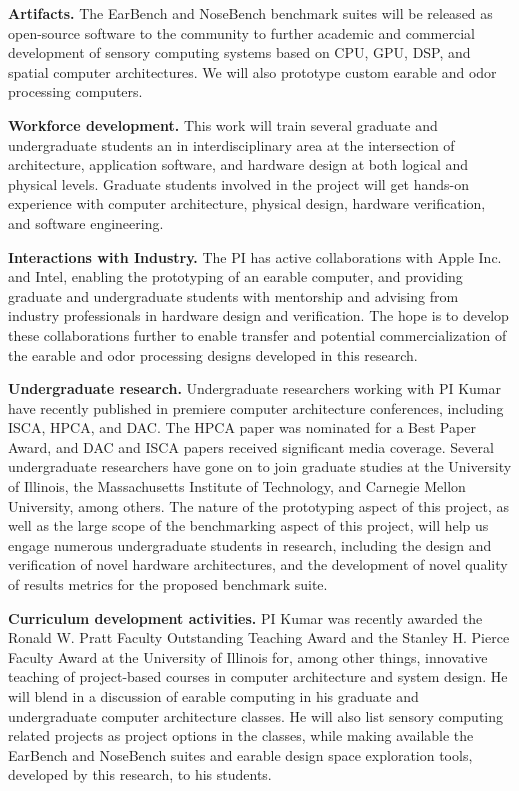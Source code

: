 \textbf{Artifacts.} The EarBench and NoseBench benchmark suites will be
released as open-source software to the community to further academic and
commercial development of sensory computing systems based on CPU, GPU, DSP, and
spatial computer architectures. We will also prototype custom earable
and odor processing computers.

\textbf{Workforce development.}  This work will train several graduate and
undergraduate students an in interdisciplinary area at the intersection of
architecture, application software, and hardware design at both logical and
physical levels.  Graduate students involved in the project will get hands-on
experience with computer architecture, physical design, hardware verification,
and software engineering.

\textbf{Interactions with Industry.}  The PI has active collaborations with
Apple Inc. and Intel, enabling the prototyping of an earable computer, and
providing graduate and undergraduate students with mentorship and advising from
industry professionals in hardware design and verification.  The hope is to
develop these collaborations further to enable transfer and potential
commercialization of the earable and odor processing designs developed in this
research.

\textbf{Undergraduate research.}  Undergraduate researchers working with PI
Kumar have recently published in premiere computer architecture conferences,
including ISCA, HPCA, and DAC.  The HPCA paper was nominated for a Best Paper
Award, and DAC and ISCA papers received significant media coverage.  Several
undergraduate researchers have gone on to join graduate studies at the
University of Illinois, the Massachusetts Institute of Technology, and Carnegie
Mellon University, among others.  The nature of the prototyping aspect of this
project, as well as the large scope of the benchmarking aspect of this project,
will help us engage numerous undergraduate students in research, including the
design and verification of novel hardware architectures, and the development of
novel quality of results metrics for the proposed benchmark suite.

\textbf{Curriculum development activities.}  PI Kumar was recently awarded the
Ronald W. Pratt Faculty Outstanding Teaching Award and the Stanley H. Pierce
Faculty Award at the University of Illinois for, among other things, innovative
teaching of project-based courses in computer architecture and system design.
He will blend in a discussion of earable computing in his graduate and
undergraduate computer architecture classes.  He will also list sensory
computing related projects as project options in the classes, while making
available the EarBench and NoseBench suites and earable design space
exploration tools, developed by this research, to his students.

